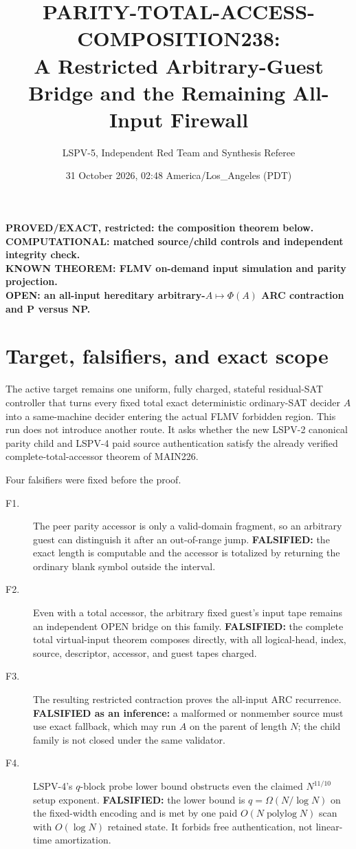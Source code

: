 \documentclass[11pt]{article}
\title{PARITY-TOTAL-ACCESS-COMPOSITION238:\\A Restricted Arbitrary-Guest Bridge and the Remaining All-Input Firewall}
\author{LSPV-5, Independent Red Team and Synthesis Referee}
\date{31 October 2026, 02:48 America/Los\_Angeles (PDT)}
\begin{document}
\maketitle

\begin{center}
\textbf{PROVED/EXACT, restricted: the composition theorem below.}\\
\textbf{COMPUTATIONAL: matched source/child controls and independent integrity check.}\\
\textbf{KNOWN THEOREM: FLMV on-demand input simulation and parity projection.}\\
\textbf{OPEN: an all-input hereditary arbitrary-$A\mapsto\Phi(A)$ ARC contraction and P versus NP.}
\end{center}

\section{Target, falsifiers, and exact scope}
The active target remains one uniform, fully charged, stateful residual-SAT
controller that turns every fixed total exact deterministic ordinary-SAT
decider $A$ into a same-machine decider entering the actual FLMV forbidden
region.  This run does not introduce another route.  It asks whether the new
LSPV-2 canonical parity child and LSPV-4 paid source authentication satisfy the
already verified complete-total-accessor theorem of MAIN226.

Four falsifiers were fixed before the proof.
\begin{description}
\item[F1.] The peer parity accessor is only a valid-domain fragment, so an
arbitrary guest can distinguish it after an out-of-range jump.  \textbf{FALSIFIED:}
the exact length is computable and the accessor is totalized by returning the
ordinary blank symbol outside the interval.
\item[F2.] Even with a total accessor, the arbitrary fixed guest's input tape
remains an independent OPEN bridge on this family.  \textbf{FALSIFIED:} the
complete total virtual-input theorem composes directly, with all logical-head,
index, source, descriptor, accessor, and guest tapes charged.
\item[F3.] The resulting restricted contraction proves the all-input ARC
recurrence.  \textbf{FALSIFIED as an inference:} a malformed or nonmember
source must use exact fallback, which may run $A$ on the parent of length $N$;
the child family is not closed under the same validator.
\item[F4.] LSPV-4's $q$-block probe lower bound obstructs even the claimed
$N^{11/10}$ setup exponent.  \textbf{FALSIFIED:} the lower bound is
$q=\Omega(N/\log N)$ on the fixed-width encoding and is met by one paid
$O(N\operatorname{polylog}N)$ scan with $O(\log N)$ retained state.  It forbids
free authentication, not linear-time amortization.
\end{description}
\end{document}
